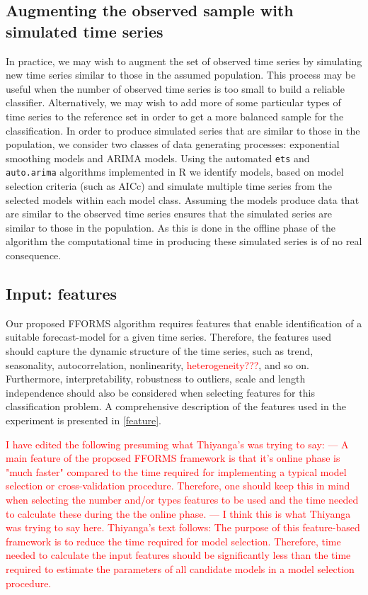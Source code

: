 \documentclass[11pt,a4paper,]{article}
\theoremstyle{definition}
\theoremstyle{definition}
\theoremstyle{definition}
\theoremstyle{remark}
\begin{document}
\hypertarget{simulatingseries}{%
\subsection{Augmenting the observed sample with simulated time
series}\label{simulatingseries}}

In practice, we may wish to augment the set of observed time series by
simulating new time series similar to those in the assumed population.
This process may be useful when the number of observed time series is
too small to build a reliable classifier. Alternatively, we may wish to
add more of some particular types of time series to the reference set in
order to get a more balanced sample for the classification. In order to
produce simulated series that are similar to those in the population, we
consider two classes of data generating processes: exponential smoothing
models and ARIMA models. Using the automated \texttt{ets} and
\texttt{auto.arima} algorithms implemented in R \autocite{forecast} we
identify models, based on model selection criteria (such as AICc) and
simulate multiple time series from the selected models within each model
class. Assuming the models produce data that are similar to the observed
time series ensures that the simulated series are similar to those in
the population. As this is done in the offline phase of the algorithm
the computational time in producing these simulated series is of no real
consequence.

\hypertarget{input-features}{%
\subsection{Input: features}\label{input-features}}

Our proposed FFORMS algorithm requires features that enable
identification of a suitable forecast-model for a given time series.
Therefore, the features used should capture the dynamic structure of the
time series, such as trend, seasonality, autocorrelation, nonlinearity,
\textcolor{red}{heterogeneity???}, and so on. Furthermore,
interpretability, robustness to outliers, scale and length independence
should also be considered when selecting features for this
classification problem. A comprehensive description of the features used
in the experiment is presented in \autoref{feature}.

\textcolor{red}{I have edited the following presuming what Thiyanga's was trying to say: --- A main feature of the proposed FFORMS framework is that it's online phase is "much faster" compared to the time required for implementing a typical model selection or cross-validation procedure. Therefore, one should keep this in mind when selecting the number and/or types features to be used and the time needed to calculate these during the the online phase. --- I think this is what Thiyanga was trying to say here. Thiyanga's text follows: The purpose of this feature-based framework is to reduce the time required for model selection. Therefore, time needed to calculate the input features should be significantly less than the time required to estimate the parameters of all  candidate models in a model selection procedure.}
\end{document}
